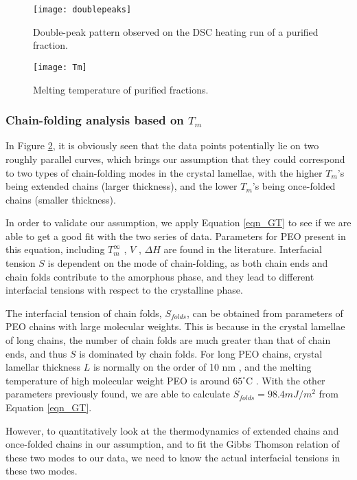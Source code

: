 \begin{figure}[H]
	\center
	\texttt{[image: doublepeaks]}
	\caption{Double-peak pattern observed on the DSC heating run of a purified fraction.}
	\label{fig:doublepeaks}
\end{figure}

\begin{figure}[H]
\center
\texttt{[image: Tm]}
\caption{Melting temperature of purified fractions.}
\label{fig:Tm}
\end{figure}

\subsubsection{Chain-folding analysis based on $T_{m}$}

In Figure \ref{fig:Tm}, it is obviously seen that the data points potentially lie on two roughly parallel curves, which brings our assumption that they could correspond to two types of chain-folding modes in the crystal lamellae, with the higher $T_{m}$'s being extended chains (larger thickness), and the lower $T_{m}$'s being once-folded chains (smaller thickness).

In order to validate our assumption, we apply Equation \ref{eqn_GT} to see if we are able to get a good fit with the two series of data. Parameters for PEO present in this equation, including $T_{m}^{\infty}$ \cite{Buckley1975}, $V$ \cite{Wong2015}, $\Delta H$ \cite{Pielichowski2002} are found in the literature. Interfacial tension $S$ is dependent on the mode of chain-folding, as both chain ends and chain folds contribute to the amorphous phase, and they lead to different interfacial tensions with respect to the crystalline phase.

The interfacial tension of chain folds, $S_{folds}$, can be obtained from parameters of PEO chains with large molecular weights. This is because in the crystal lamellae of long chains, the number of chain folds are much greater than that of chain ends, and thus $S$ is dominated by chain folds. For long PEO chains, crystal lamellar thickness $L$ is normally on the order of 10 nm \cite{Okerberg2007}, and the melting temperature of high molecular weight PEO is around $65^\circ$C \cite{Herzberger2015}. With the other parameters previously found, we are able to calculate $S_{folds} = 98.4 mJ/m^2$ from Equation \ref{eqn_GT}.

However, to quantitatively look at the thermodynamics of extended chains and once-folded chains in our assumption, and to fit the Gibbs Thomson relation of these two modes to our data, we need to know the actual interfacial tensions in these two modes. 

